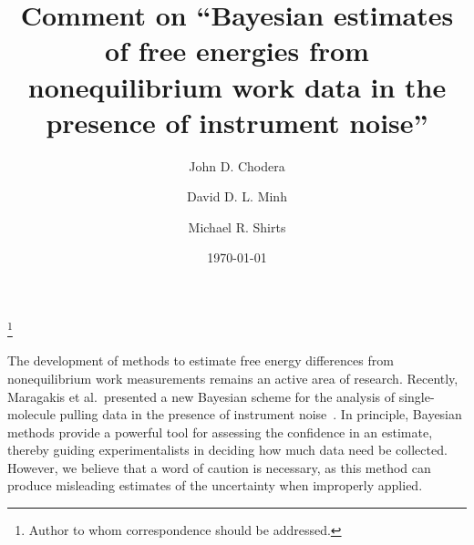 \documentclass[aps,pre,twocolumn,superscriptaddress,nofootinbib]{revtex4}
\begin{document}
\title{Comment on ``Bayesian estimates of free energies from nonequilibrium work data in the presence of instrument noise''}

\author{John D. Chodera}
 \thanks{Author to whom correspondence should be addressed.}
\author{David D. L. Minh}
\author{Michael R. Shirts}

\date{\today}


\maketitle


The development of methods to estimate free energy differences from nonequilibrium work measurements remains an active area of research.  
Recently, Maragakis et al.~presented a new Bayesian scheme for the analysis of single-molecule pulling data in the presence of instrument noise~\cite{maragakis:jcp:2008:bayesian-bar}.
In principle, Bayesian methods provide a powerful tool for assessing the confidence in an estimate, thereby guiding experimentalists in deciding how much data need be collected.  
However, we believe that a word of caution is necessary, as this method can produce misleading estimates of the uncertainty when improperly applied.
\end{document}
